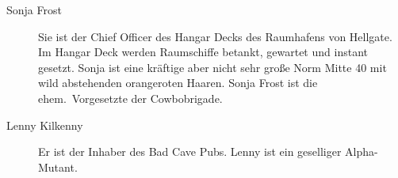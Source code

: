 
\begin{description}
    \item[Sonja Frost] Sie ist der Chief Officer des Hangar Decks des Raumhafens von Hellgate. Im Hangar Deck werden Raumschiffe    
        betankt, gewartet und instant gesetzt. Sonja ist eine kräftige aber nicht sehr große Norm Mitte 40 mit wild abstehenden orangeroten Haaren. Sonja Frost ist die ehem.~Vorgesetzte der Cowbobrigade.
    \item[Lenny Kilkenny] Er ist der Inhaber des Bad Cave Pubs. Lenny ist ein geselliger Alpha-Mutant.
\end{description}
